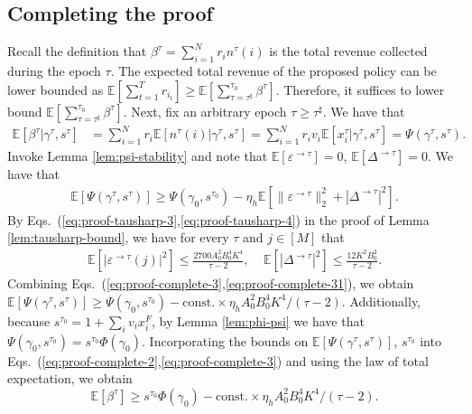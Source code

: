 \documentclass[opre]{informs3aa}
\newcommand{\const}{\mathrm{const}}
\begin{document}
\subsection{Completing the proof}

Recall the definition that $\beta^\tau=\sum_{i=1}^N r_in^\tau(i)$ is the total revenue collected during the epoch $\tau$.
The expected total revenue of the proposed policy can be lower bounded as
$\mathbb E[\sum_{t=1}^T r_{i_t}] \geq \mathbb E[\sum_{\tau=\tau^\sharp}^{\tau_0} \beta^\tau]$.
Therefore, it suffices to lower bound $\mathbb E[\sum_{\tau=\tau^\sharp}^{\tau_0}\beta^\tau]$.
Next, fix an arbitrary epoch $\tau\geq\tau^\sharp$. We have that
\begin{align}
\mathbb E[\beta^\tau|\gamma^\tau,s^\tau] &= \sum_{i=1}^N r_i\mathbb E[n^\tau(i)|\gamma^\tau,s^\tau] = \sum_{i=1}^N r_iv_i\mathbb E[x_i^\tau|\gamma^\tau,s^\tau]
=  \Psi(\gamma^\tau,s^\tau).
\label{eq:proof-complete-2}
\end{align}
Invoke Lemma \ref{lem:psi-stability} and note that $\mathbb E[\varepsilon^{\to\tau}]=0$, $\mathbb E[\Delta^{\to\tau}] = 0$. We have that 
\begin{align}
\mathbb E[\Psi(\gamma^\tau,s^\tau)] \geq \Psi(\gamma_0,s^{\tau_0}) - \eta_h\mathbb E[\|\varepsilon^{\to\tau}\|_2^2+|\Delta^{\to\tau}|^2].
\label{eq:proof-complete-3}
\end{align}
By Eqs.~(\ref{eq:proof-tausharp-3},\ref{eq:proof-tausharp-4}) in the proof of Lemma \ref{lem:tausharp-bound}, we have for every $\tau$ and $j\in[M]$ that
\begin{align}
\mathbb E\left[|\varepsilon^{\to\tau}(j)|^2\right] \leq \frac{2700 A_0^2B_0^4K^4}{\tau-2}, \;\;\;\; \mathbb E\left[|\Delta^{\to\tau}|^2\right] \leq \frac{12K^2 B_0^2}{\tau-2}.
\label{eq:proof-complete-31}
\end{align}
Combining Eqs.~(\ref{eq:proof-complete-3},\ref{eq:proof-complete-31}), we obtain
$\mathbb E[\Psi(\gamma^\tau,s^\tau)] \geq  \Psi(\gamma_0,s^{\tau_0}) - \const.\times \eta_h A_0^2 B_0^4 K^4/(\tau-2)$.
Additionally, because $s^{\tau_0}=1+\sum_i v_ix_i^F$, by Lemma \ref{lem:phi-psi} we have that $\Psi(\gamma_0,s^{\tau_0}) = s^{\tau_0}\Phi(\gamma_0)$.
Incorporating the bounds on $\mathbb E[\Psi(\gamma^\tau,s^\tau)]$, $s^{\tau_0}$ into Eqs.~(\ref{eq:proof-complete-2},\ref{eq:proof-complete-3}) and using the law of total expectation, we obtain
\begin{equation}
\mathbb E[\beta^\tau] \geq s^{\tau_0}\Phi(\gamma_0) -\const.\times \eta_h A_0^2 B_0^4 K^4/(\tau-2) .
\label{eq:proof-complete-5}
\end{equation}
\end{document}
